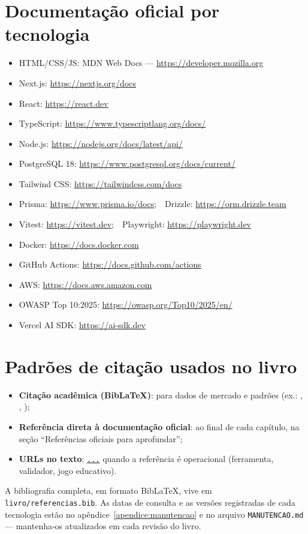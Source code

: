 \section{Documentação oficial por tecnologia}

\begin{itemize}[leftmargin=*, itemsep=0.4em]
  \item HTML/CSS/JS: MDN Web Docs --- \url{https://developer.mozilla.org}
  \item Next.js: \url{https://nextjs.org/docs}
  \item React: \url{https://react.dev}
  \item TypeScript: \url{https://www.typescriptlang.org/docs/}
  \item Node.js: \url{https://nodejs.org/docs/latest/api/}
  \item PostgreSQL 18: \url{https://www.postgresql.org/docs/current/}
  \item Tailwind CSS: \url{https://tailwindcss.com/docs}
  \item Prisma: \url{https://www.prisma.io/docs};\ \ Drizzle: \url{https://orm.drizzle.team}
  \item Vitest: \url{https://vitest.dev};\ \ Playwright: \url{https://playwright.dev}
  \item Docker: \url{https://docs.docker.com}
  \item GitHub Actions: \url{https://docs.github.com/actions}
  \item AWS: \url{https://docs.aws.amazon.com}
  \item OWASP Top 10:2025: \url{https://owasp.org/Top10/2025/en/}
  \item Vercel AI SDK: \url{https://ai-sdk.dev}
\end{itemize}

\section{Padrões de citação usados no livro}

\begin{itemize}[leftmargin=*, itemsep=0.4em]
  \item \textbf{Citação acadêmica (BibLaTeX)}: para dados de mercado e
  padrões (ex.: \cite{so2025}, \cite{octoverse2025}, \cite{owasp2025});
  \item \textbf{Referência direta à documentação oficial}: ao final de cada
  capítulo, na seção ``Referências oficiais para aprofundar'';
  \item \textbf{URLs no texto}: \texttt{\url{...}} quando a referência é
  operacional (ferramenta, validador, jogo educativo).
\end{itemize}

\begin{caixadica}
A bibliografia completa, em formato BibLaTeX, vive em
\texttt{livro/referencias.bib}. As datas de consulta e as versões registradas
de cada tecnologia estão no apêndice~\ref{apendice:manutencao} e no arquivo
\texttt{MANUTENCAO.md} — mantenha-os atualizados em cada revisão do livro.
\end{caixadica}
